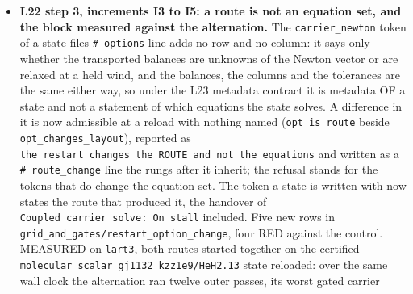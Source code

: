 \documentclass[english,a4paper]{my_memo}
\begin{document}
\begin{itemize}
  the wind, MEASURED: the unmodified HLLC flux certifies the same
  \texttt{x0.10/HeH9.7} case on a grid of twice the cells and the state it reaches is
  the 500-cell Roe state (Mdot +1.0 per cent, equivalent width -0.4 per cent,
  T and rho within 0.1 to 3 per cent above 1.005 R\_p). Where both fluxes solve,
  Roe against HLLC lowers Mdot and the He 10830 equivalent width by 0.3 to 0.6
  per cent and leaves the first cell 6 to 7 per cent colder and 6 to 8 per cent
  denser with the mass-flux spread unchanged, and that systematic is now stated
  wherever those cases are quoted. The flux is a property of the case in
  \texttt{LHS1140b/models/make\_models.py} (\texttt{ROE\_CASES}, default HLLC), \texttt{status.py}
  prints it as a \texttt{flux} column, \texttt{write\_reproduce.py} records it with the
  systematic, and \texttt{LHS1140b/MODELS.md} and
  \texttt{docs/lhs1140b\_exhale\_vs\_pwinds.tex} carry the decision. The catalog\textquotesingle s states
  for these cases are made by the campaign re-run on the final binary; no
  output of the measurement directories is copied into a case directory. Memo:
  \texttt{docs/lhs1140b\_stationary\_L25\_20260916.md}, step 3.
\item
  \textbf{L22 step 3, increments I3 to I5: a route is not an equation set, and the
  block measured against the alternation.} The \texttt{carrier\_newton} token of a
  state file\textquotesingle s \texttt{\#\ options} line adds no row and no column: it says only whether
  the transported balances are unknowns of the Newton vector or are relaxed at
  a held wind, and the balances, the columns and the tolerances are the same
  either way, so under the L23 metadata contract it is metadata OF a state and
  not a statement of which equations the state solves. A difference in it is
  now admissible at a reload with nothing named (\texttt{opt\_is\_route} beside
  \texttt{opt\_changes\_layout}), reported as \texttt{the\ restart\ changes\ the\ ROUTE\ and\ not\ the\ equations} and written as a \texttt{\#\ route\_change} line the rungs after it inherit;
  the refusal stands for the tokens that do change the equation set. The token
  a state is written with now states the route that produced it, the handover
  of \texttt{Coupled\ carrier\ solve:\ On\ stall} included. Five new rows in
  \texttt{grid\_and\_gates/restart\_option\_change}, four RED against the control.
  MEASURED on \texttt{lart3}, both routes started together on the certified
  \texttt{molecular\_scalar\_gj1132\_kzz1e9/HeH2.13} state reloaded: over the same
  wall clock the alternation ran twelve outer passes, its worst gated carrier

\end{itemize}
\end{document}
